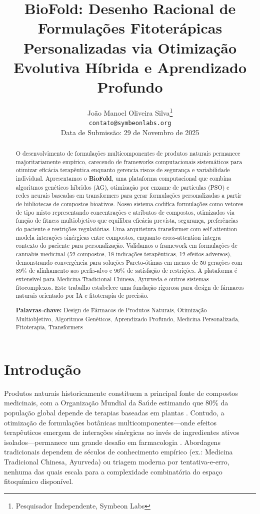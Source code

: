 \documentclass[11pt,a4paper]{article}
\title{\textbf{BioFold: Desenho Racional de Formulações Fitoterápicas Personalizadas via Otimização Evolutiva Híbrida e Aprendizado Profundo}}
\author{
  João Manoel Oliveira Silva\footnote{Pesquisador Independente, Symbeon Labs} \\
  \texttt{contato@symbeonlabs.org} \\
  Data de Submissão: 29 de Novembro de 2025
}
\date{}
\begin{document}
\maketitle

\begin{abstract}
O desenvolvimento de formulações multicomponentes de produtos naturais permanece majoritariamente empírico, carecendo de frameworks computacionais sistemáticos para otimizar eficácia terapêutica enquanto gerencia riscos de segurança e variabilidade individual. Apresentamos o \textbf{BioFold}, uma plataforma computacional que combina algoritmos genéticos híbridos (AG), otimização por enxame de partículas (PSO) e redes neurais baseadas em transformers para gerar formulações personalizadas a partir de bibliotecas de compostos bioativos. Nosso sistema codifica formulações como vetores de tipo misto representando concentrações e atributos de compostos, otimizados via função de fitness multiobjetivo que equilibra eficácia prevista, segurança, preferências do paciente e restrições regulatórias. Uma arquitetura transformer com self-attention modela interações sinérgicas entre compostos, enquanto cross-attention integra contexto do paciente para personalização. Validamos o framework em formulações de cannabis medicinal (52 compostos, 18 indicações terapêuticas, 12 efeitos adversos), demonstrando convergência para soluções Pareto-ótimas em menos de 50 gerações com 89\% de alinhamento aos perfis-alvo e 96\% de satisfação de restrições. A plataforma é extensível para Medicina Tradicional Chinesa, Ayurveda e outros sistemas fitocomplexos. Este trabalho estabelece uma fundação rigorosa para design de fármacos naturais orientado por IA e fitoterapia de precisão.

\textbf{Palavras-chave:} Design de Fármacos de Produtos Naturais, Otimização Multiobjetivo, Algoritmos Genéticos, Aprendizado Profundo, Medicina Personalizada, Fitoterapia, Transformers
\end{abstract}

\section{Introdução}

Produtos naturais historicamente constituem a principal fonte de compostos medicinais, com a Organização Mundial da Saúde estimando que 80\% da população global depende de terapias baseadas em plantas \cite{WHO2019}. Contudo, a otimização de formulações botânicas multicomponentes—onde efeitos terapêuticos emergem de interações sinérgicas ao invés de ingredientes ativos isolados—permanece um grande desafio em farmacologia \cite{Russo2011,Yuan2016}. Abordagens tradicionais dependem de séculos de conhecimento empírico (ex.: Medicina Tradicional Chinesa, Ayurveda) ou triagem moderna por tentativa-e-erro, nenhuma das quais escala para a complexidade combinatória do espaço fitoquímico disponível.
\end{document}
